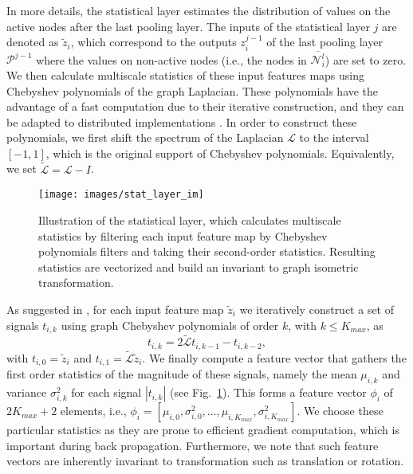 \documentclass[10pt,journal,compsoc]{IEEEtran}
\begin{document}
	In more details, the statistical layer estimates the  distribution of values on the active nodes after the last pooling layer. The inputs of the statistical layer $j$ are denoted as $\tilde{z}_i$, which correspond to the outputs $z_i^{j-1}$ of the last pooling layer $\mathcal{P}^{j-1}$ where the values on non-active nodes (i.e., the nodes in $\overline{\mathcal{N}_i^{l}}$) are set to zero. We then calculate multiscale statistics of these input features maps using Chebyshev polynomials of the graph Laplacian. These polynomials have the advantage of a fast computation due to their iterative construction, and they can be adapted to distributed implementations \cite{bb:shuman2011chebyshev}. In order to construct these polynomials, we first shift the spectrum of the Laplacian $\mathcal{L}$ to the interval $[-1,1]$, which is the original support of Chebyshev polynomials. Equivalently, we set $\tilde{\mathcal{L}} = \mathcal{L} - I $. 
	
	\begin{figure}[!t]
		\centering
		\texttt{[image: images/stat\_layer\_im]} 
		\caption{Illustration of the statistical layer, which calculates multiscale statistics by filtering each input feature map by Chebyshev polynomials filters \cite{bb:shuman2011chebyshev} and taking their second-order statistics. Resulting statistics are vectorized and build an invariant to graph isometric transformation.  
		}
		\label{fig:stat_layer_im}
	\end{figure}
	
	As suggested in \cite{bb:Mikhael}, for each input feature map $\tilde{z}_i$ we iteratively construct a set of signals $t_{i,k}$ using graph Chebyshev polynomials of order $k$, with $k \leq K_{max}$, as
	\begin{equation}
	t_{i,k} = 2 \tilde{\mathcal{L}} t_{i, k-1} - t_{i, k-2},
	\end{equation}
	\noindent
	with $t_{i, 0} = \tilde{z}_i$ and $t_{i, 1}=\tilde{\mathcal{L}} \tilde{z}_i$.
	We finally compute a feature vector that gathers the first order statistics of the magnitude of these signals, namely the mean $\mu_{i,k}$ and variance $\sigma^2_{i,k}$ for each signal $| t_{i,k} |$  (see Fig.~\ref{fig:stat_layer_im}). This forms a feature vector $\phi_{i}$ of $2 K_{max}+2$ elements, i.e., $\phi_{i} = [\mu_{i,0},\sigma^2_{i,0}, \hdots, \mu_{i,K_{max}},\sigma^2_{i,K_{max}} ]$. We choose these particular statistics as they are prone to efficient gradient computation, which is important during back propagation. Furthermore, we note that such feature vectors are inherently invariant to transformation such as translation or rotation.
	
\end{document}
